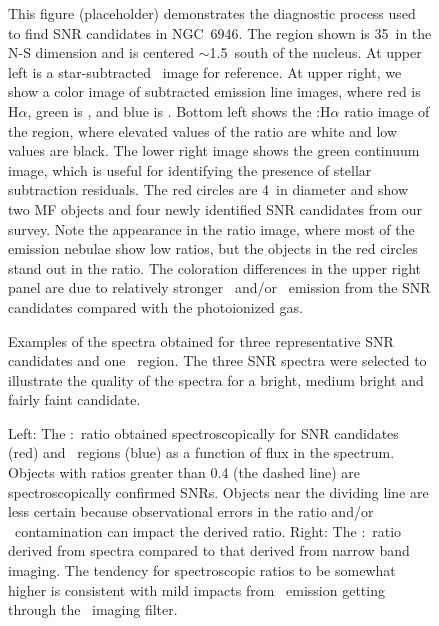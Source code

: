 \begin{figure}
\caption{This figure (placeholder) demonstrates the diagnostic process used to find SNR candidates in NGC~6946.  The region shown is 35\arcsec\ in the N-S dimension and is centered $\sim$1.5\arcmin\ south of the nucleus.  At upper left is a star-subtracted \sii\ image for reference.  At upper right, we show a color image of subtracted emission line images, where red is H$\alpha$, green is \sii, and blue is \oiii.  Bottom left shows the \sii:H$\alpha$ ratio image of the region, where elevated values of the  ratio are white and low values are black.  The lower right image shows the green continuum image, which is useful for identifying the presence of stellar subtraction residuals.  The red circles are 4\arcsec\ in diameter and show two MF objects and four newly identified SNR candidates from our survey.  Note the appearance in the ratio image, where most of the emission nebulae show low ratios, but the objects in the red circles stand out in the ratio.  The coloration differences in the upper right panel are due to relatively stronger \sii\ and/or \oiii\ emission from the SNR candidates compared with the photoionized gas. \label{fig_diagnostic}}
\end{figure}

\begin{figure}
\caption{Examples of the spectra obtained for three representative SNR candidates and one \hii\ region.  The three SNR spectra were selected to illustrate the quality of the spectra for a bright, medium bright and fairly faint candidate.  \label{fig_example_spectra}}
\end{figure}

\begin{figure}

\caption{Left: The \sii:\ha\ ratio obtained spectroscopically for SNR candidates (red) and \hii\ regions (blue) as a function of \ha flux in the spectrum.  Objects with ratios greater than 0.4 (the dashed line) are spectroscopically confirmed SNRs.  Objects near the dividing line are less certain because observational errors in the ratio and/or \hii\ contamination can impact the derived ratio. Right: The \sii:\ha\ ratio derived from spectra compared to that derived from narrow band imaging.  The tendency for spectroscopic ratios to be somewhat higher is consistent with mild impacts from \nii\ emission getting through the \ha\ imaging filter.  \label{fig_s2_ha}}

\end{figure}


